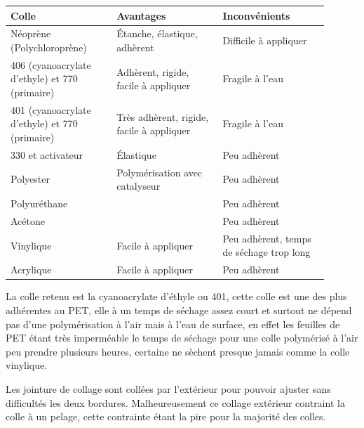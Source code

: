 \documentclass[a4paper,11pt]{article}
\begin{document}
\begin{center}
  \begin{tabular}{|p{0.3\linewidth}|p{0.3\linewidth}|p{0.3\linewidth}|}
		\hline
		Colle & Avantages & Inconvénients \\
		\hline

		\rowcolor{OrangeT}
		Néoprène (Polychloroprène) &
		Étanche, élastique, adhèrent &
		Difficile à appliquer \\
		\hline

		\rowcolor{OrangeT}
		406 (cyanoacrylate d'ethyle) et 770 (primaire) &
		Adhèrent, rigide, facile à appliquer &
		Fragile à l'eau \\
		\hline

		\rowcolor{GreenT}
		401 (cyanoacrylate d'ethyle) et 770 (primaire) &
		Très adhèrent, rigide, facile à appliquer &
		Fragile à l'eau \\
		\hline

		\rowcolor{RedT}
		330 et activateur &
		Élastique &
		Peu adhèrent \\
		\hline

		\rowcolor{RedT}
		Polyester &
		Polymérisation avec catalyseur &
		Peu adhèrent \\
		\hline
		
		\rowcolor{RedT}
		Polyuréthane &
		& Peu adhèrent \\
		\hline

		\rowcolor{RedT}
		Acétone &
		& Peu adhèrent \\
		\hline
		
		\rowcolor{RedT}
		Vinylique &
		Facile à appliquer &
		Peu adhèrent, temps de séchage trop long \\
		\hline

		\rowcolor{RedT}
		Acrylique &
		Facile à appliquer &
		Peu adhèrent \\
		\hline
  \end{tabular}
\end{center}

La colle retenu est la cyanoacrylate d'éthyle ou 401, cette colle est une des plus adhérentes au PET, elle à un temps de séchage assez court et surtout ne dépend pas d'une polymérisation à l'air mais à l'eau de surface, en effet les feuilles de PET étant très imperméable le temps de séchage pour une colle polymérisé à l'air peu prendre plusieurs heures, certaine ne sèchent presque jamais comme la colle vinylique.

Les jointure de collage sont collées par l'extérieur pour pouvoir ajuster sans difficultés les deux bordures. Malheureusement ce collage extérieur contraint la colle à un pelage, cette contrainte étant la pire pour la majorité des colles.
\end{document}
